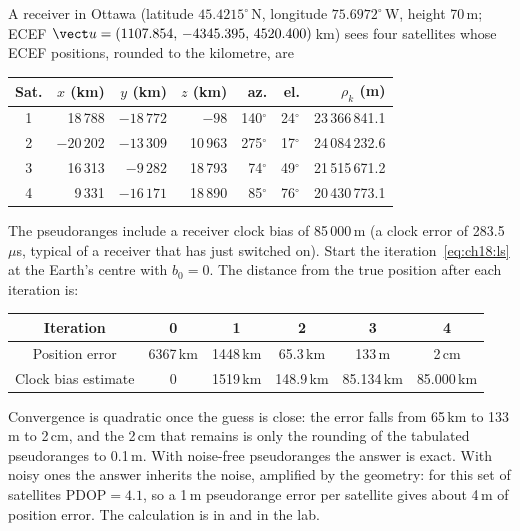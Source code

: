 \begin{worked}
A receiver in Ottawa (latitude $45.4215^\circ$\,N, longitude $75.6972^\circ$\,W, height 70\,m;
ECEF $\vect u=(1107.854,\,-4345.395,\,4520.400)$\,km) sees four satellites whose ECEF
positions, rounded to the kilometre, are
\begin{center}\small
\begin{tabular}{@{}c r r r r r r@{}}
\toprule
Sat. & $x$ (km) & $y$ (km) & $z$ (km) & az. & el. & $\rho_k$ (m)\\
\midrule
1 & 18\,788 & $-18\,772$ & $-98$ & 140$^\circ$ & 24$^\circ$ & 23\,366\,841.1\\
2 & $-20\,202$ & $-13\,309$ & 10\,963 & 275$^\circ$ & 17$^\circ$ & 24\,084\,232.6\\
3 & 16\,313 & $-9\,282$ & 18\,793 & 74$^\circ$ & 49$^\circ$ & 21\,515\,671.2\\
4 & 9\,331 & $-16\,171$ & 18\,890 & 85$^\circ$ & 76$^\circ$ & 20\,430\,773.1\\
\bottomrule
\end{tabular}
\end{center}
The pseudoranges include a receiver clock bias of 85\,000\,m (a clock error of 283.5\,$\mu$s,
typical of a receiver that has just switched on). Start the iteration~\eqref{eq:ch18:ls} at the
Earth's centre with $b_0=0$. The distance from the true position after each iteration is:
\begin{center}\small
\begin{tabular}{@{}c c c c c c@{}}
\toprule
Iteration & 0 & 1 & 2 & 3 & 4\\
\midrule
Position error & 6367\,km & 1448\,km & 65.3\,km & 133\,m & 2\,cm\\
Clock bias estimate & 0 & 1519\,km & 148.9\,km & 85.134\,km & 85.000\,km\\
\bottomrule
\end{tabular}
\end{center}
Convergence is quadratic once the guess is close: the error falls from 65\,km to 133\,m to
2\,cm, and the 2\,cm that remains is only the rounding of the tabulated pseudoranges to
0.1\,m. With noise-free pseudoranges the answer is exact. With noisy ones the answer inherits the
noise, amplified by the geometry: for this set of satellites $\text{PDOP}=4.1$, so a 1\,m
pseudorange error per satellite gives about 4\,m of position error. The calculation is in
 and in the lab.
\end{worked}

